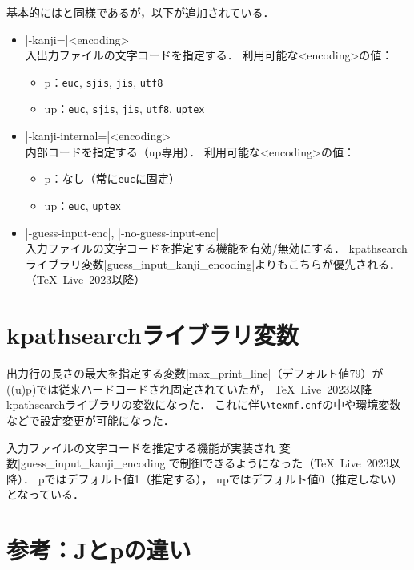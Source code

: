 \documentclass[a4paper,11pt,nomag,dvipdfmx]{jsarticle}
\def\code#1{\texttt{#1}}
\def\file#1{\texttt{#1}}
\def\JBibTeX{\leavevmode\textcompwordmark\lower.5ex\hbox{J}\kern-.08em\BibTeX}
\def\pBibTeX{p\kern-.05em\BibTeX}
\def\upBibTeX{u\pBibTeX}
\def\JBibTeX{J\BibTeX}%
\def\pBibTeX{p\BibTeX}%
\def\upBibTeX{u\pBibTeX}%
\def\TL{\TeX~Live}
\begin{document}
基本的には\BibTeX と同様であるが，以下が追加されている．
\begin{itemize}
 \item |-kanji=|<encoding>\\
   入出力ファイルの文字コードを指定する．
   利用可能な<encoding>の値：
   \begin{itemize}
    \item \pBibTeX ：\code{euc}, \code{sjis}, \code{jis}, \code{utf8}
    \item \upBibTeX ：\code{euc}, \code{sjis}, \code{jis}, \code{utf8}, \code{uptex}
   \end{itemize}
 \item |-kanji-internal=|<encoding>\\
   内部コードを指定する（\upBibTeX 専用）．
   利用可能な<encoding>の値：
   \begin{itemize}
    \item \pBibTeX ：なし（常に\code{euc}に固定）
    \item \upBibTeX ：\code{euc}, \code{uptex}
   \end{itemize}
 \item |-guess-input-enc|, |-no-guess-input-enc|\\
   入力ファイルの文字コードを推定する機能を有効/無効にする．
   kpathsearchライブラリ変数|guess_input_kanji_encoding|よりもこちらが優先される．（\TL~2023以降）
\end{itemize}


\section{kpathsearchライブラリ変数}\label{sec:kpathsearch}

出力行の長さの最大を指定する変数|max_print_line|（デフォルト値79）が
((u)p)\BibTeX では従来ハードコードされ固定されていたが，
\TL~2023以降kpathsearchライブラリの変数になった．
これに伴い\file{texmf.cnf}の中や環境変数などで設定変更が可能になった．

入力ファイルの文字コードを推定する機能が実装され
変数|guess_input_kanji_encoding|で制御できるようになった（\TL~2023以降）．
\pBibTeX ではデフォルト値1（推定する），
\upBibTeX ではデフォルト値0（推定しない）となっている．

\section{参考：\JBibTeX と\pBibTeX の違い}\label{diff}
\end{document}
